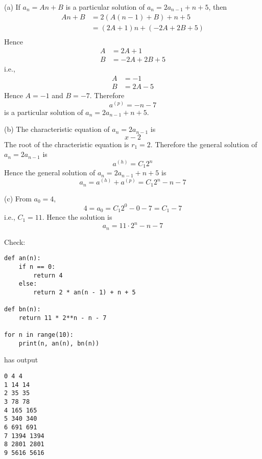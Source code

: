 
(a)
If $a_n = An + B$ is a particular solution of $a_n = 2 a_{n - 1} + n + 5$, then
\begin{align*}
  An + B
  &= 2 (A(n - 1) + B) + n + 5 \\ 
  &= (2A + 1) n + (-2A + 2B + 5) \\ 
\end{align*}
Hence
\begin{align*}
  A &= 2A + 1 \\
  B &= -2A + 2B + 5 
\end{align*}
i.e.,
\begin{align*}
  A &= - 1 \\
  B &= 2A - 5 
\end{align*}
Hence $A = -1$ and $B = -7$.
Therefore
\[
a^{(p)} = -n -7
\]
is a particular solution of $a_n = 2 a_{n - 1} + n + 5$.


(b)
The characteristic equation of $a_n = 2 a_{n - 1}$ is
\[
x - 2
\]
The root of the chracteristic equation is $r_1 = 2$.
Therefore the general solution of $a_n = 2a_{n - 1}$ is
\[
a^{(h)} = C_1 2^n
\]
Hence the general solution of $a_n = 2 a_{n - 1} + n + 5$ is
\[
a_n = a^{(h)} +  a^{(p)} = C_1 2^n - n - 7
\]


(c)
From $a_0 = 4$,
\[
4 = a_0 = C_1 2^0 - 0 - 7 = C_1 - 7
\]
i.e., $C_1 = 11$.
Hence the solution is
\[
a_n = 11 \cdot 2^n - n - 7
\]

Check:
\begin{Verbatim}[frame=single,fontsize=\small]
def an(n):
    if n == 0:
        return 4
    else:
        return 2 * an(n - 1) + n + 5

def bn(n):
    return 11 * 2**n - n - 7

for n in range(10):
    print(n, an(n), bn(n))     
\end{Verbatim}
has output
\begin{Verbatim}[frame=single,fontsize=\small]
0 4 4
1 14 14
2 35 35
3 78 78
4 165 165
5 340 340
6 691 691
7 1394 1394
8 2801 2801
9 5616 5616
\end{Verbatim}
